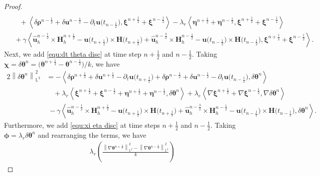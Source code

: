 \documentclass[11pt, reqno]{amsart}
\theoremstyle{definition}
\theoremstyle{remark}
\numberwithin{equation}{section}
\newcommand{\bff}{\boldsymbol}
\newcommand{\bb}{\mathbb}
\newcommand{\norm}[2]{\left\|{#1}\right\|_{#2}}
\newcommand{\inpro}[2]{\left\langle#1,#2\right\rangle}
\begin{document}
\begin{proof}
\begin{align}
	\\
	\nonumber
	&\quad
	+
	\inpro{\delta \bff{\rho}^{n-\frac{1}{2}} + \delta \bff{u}^{n-\frac{1}{2}} - \partial_t \bff{u}\big(t_{n-\frac{1}{2}}\big)}{\bff{\xi}^{n+\frac{1}{2}}+\bff{\xi}^{n-\frac{1}{2}}}
	-
	\lambda_r \inpro{\bff{\eta}^{n+\frac{1}{2}}+\bff{\eta}^{n-\frac{1}{2}}}{\bff{\xi}^{n+\frac{1}{2}}+\bff{\xi}^{n-\frac{1}{2}}}
	\\
	&\;
	+
	\gamma \inpro{\widehat{\bff{u}}_h^{n-\frac{1}{2}} \times \bff{H}_h^{n+\frac{1}{2}} - \bff{u}\big(t_{n+\frac{1}{2}}\big)\times \bff{H}\big(t_{n+\frac{1}{2}}\big)
	+ \widehat{\bff{u}}_h^{n-\frac{3}{2}} \times \bff{H}_h^{n-\frac{1}{2}} - \bff{u}\big(t_{n-\frac{1}{2}}\big)\times \bff{H}\big(t_{n-\frac{1}{2}}\big)}{\bff{\xi}^{n+\frac{1}{2}}+\bff{\xi}^{n-\frac{1}{2}}}.
\end{align}
Next, we add \eqref{equ:dt theta disc} at time step $n+\frac{1}{2}$ and $n-\frac{1}{2}$. Taking $\bff{\chi}= \delta \bff{\theta}^n= \big(\bff{\theta}^{n+\frac{1}{2}}- \bff{\theta}^{n-\frac{1}{2}}\big)/k$, we have
\begin{align}\label{equ:d theta n disc}
	\nonumber
	2 \norm{\delta \bff{\theta}^n}{\bb{L}^2}^2
	&=
	- \inpro{\delta \bff{\rho}^{n+\frac{1}{2}}+ \delta \bff{u}^{n+\frac{1}{2}}- \partial_t \bff{u}\big(t_{n+\frac{1}{2}}\big) + \delta \bff{\rho}^{n-\frac{1}{2}}+ \delta \bff{u}^{n-\frac{1}{2}}- \partial_t \bff{u}\big(t_{n-\frac{1}{2}}\big)}{\delta \bff{\theta}^n}
	\\
	\nonumber
	&\quad
	+
	\lambda_r \inpro{\bff{\xi}^{n+\frac{1}{2}}+ \bff{\xi}^{n-\frac{1}{2}} + \bff{\eta}^{n+\frac{1}{2}} + \bff{\eta}^{n-\frac{1}{2}}}{\delta \bff{\theta}^n}
	+
	\lambda_e \inpro{\nabla \bff{\xi}^{n+\frac{1}{2}} + \nabla \bff{\xi}^{n-\frac{1}{2}}}{\nabla \delta \bff{\theta}^n}
	\\
	&\;
	-
	\gamma \inpro{\widehat{\bff{u}}_h^{n-\frac{1}{2}} \times \bff{H}_h^{n+\frac{1}{2}} - \bff{u}\big(t_{n+\frac{1}{2}}\big)\times \bff{H}\big(t_{n+\frac{1}{2}}\big)
	+ \widehat{\bff{u}}_h^{n-\frac{3}{2}} \times \bff{H}_h^{n-\frac{1}{2}} - \bff{u}\big(t_{n-\frac{1}{2}}\big)\times \bff{H}\big(t_{n-\frac{1}{2}}\big)}{\delta \bff{\theta}^n}.
\end{align}
Furthermore, we add \eqref{equ:xi eta disc} at time steps $n+\frac{1}{2}$ and $n-\frac{1}{2}$. Taking $\bff{\phi}=\lambda_r \delta \bff{\theta}^n$ and rearranging the terms, we have
\begin{align}\label{equ:nab d theta n half disc}
	\nonumber
	&\lambda_r \left(\frac{\norm{\nabla \bff{\theta}^{n+\frac{1}{2}}}{\bb{L}^2}^2 - \norm{\nabla \bff{\theta}^{n-\frac{1}{2}}}{\bb{L}^2}^2}{k}\right)

\end{align}
\end{proof}
\end{document}
